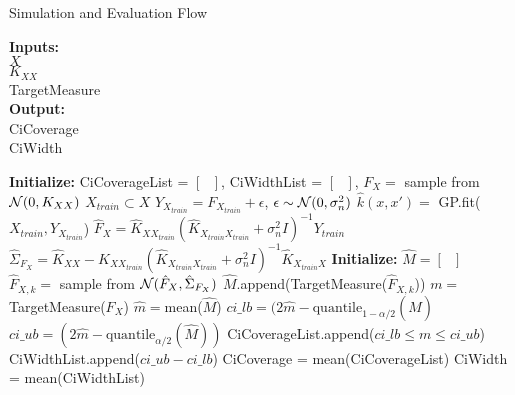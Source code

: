 \begin{algorithm}[h!] \caption{Simulation and Evaluation Flow}
 \hspace*{\algorithmicindent} \textbf{Inputs:} \\
 \hspace*{\algorithmicindent} $X$  \\
 \hspace*{\algorithmicindent} $K_{XX}$ \\
 \hspace*{\algorithmicindent} TargetMeasure  \\
 \hspace*{\algorithmicindent} \textbf{Output:} \\
 \hspace*{\algorithmicindent} CiCoverage \\
 \hspace*{\algorithmicindent} CiWidth \\
\begin{algorithmic}[1]
    \State \textbf{Initialize:} CiCoverageList = $\left[ \text{ } \right]$, CiWidthList = $\left[ \text{ } \right]$,
        \State $F_X =$ sample from $\operatorname{\mathcal{N}}(0, K_{XX})$ 
        \State $X_{train} \subset X$ 
        \State $Y_{X_{train}} = F_{X_{train}} + \epsilon$, $\epsilon \sim  \operatorname{\mathcal{N}}(0, \sigma_n^2)$
        \State $\hat{k}(x,x')=$ GP.fit($X_{train}, Y_{X_{train}}$) 
        \State $\hat{F}_X = \hat{K}_{XX_{train}} (\hat{K}_{X_{train}X_{train}} + \sigma_n^2 I)^{-1} Y_{train}$ 
        \State $\hat{\Sigma}_{F_X} = \hat{K}_{XX} -\hat{K}_{XX_{train}}(\hat{K}_{X_{train}X_{train}} + \sigma_n^2 I)^{-1}\hat{K}_{X_{train}X}$ 
        \State \textbf{Initialize:} $\hat{M} = \left[ \text{ } \right]$
            \State $\hat{F}_{X,k} = $ sample from $\operatorname{\mathcal{N}}(\hat{F}_X, \hat{\Sigma}_{F_X} )$ 
            \State $\hat{M}$.append(TargetMeasure($\hat{F}_{X, k}$)) 
        \EndFor
    \State $m =$ TargetMeasure($F_X$) 
    \State $\hat{m} = $mean($\hat{M}$)
    \State $ci\_lb = (2\hat{m} - \text{quantile}_{1-\alpha/2}(\hat{M})$ 
    \State $ci\_ub = (2\hat{m} - \text{quantile}_{\alpha/2}(\hat{M}))$ 
    \State CiCoverageList.append($ ci\_lb \leq m \leq ci\_ub$)
    \State CiWidthList.append($ci\_ub - ci\_lb $)
    \EndFor
    \State CiCoverage = mean(CiCoverageList)
    \State CiWidth = mean(CiWidthList)
\end{algorithmic}
\end{algorithm}\label{pc:simulation-evaluation-flow}




